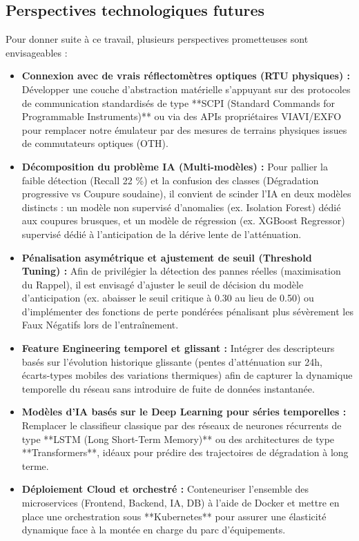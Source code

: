 \documentclass[11pt,a4paper]{article}
\begin{document}
\subsection{Perspectives technologiques futures}
Pour donner suite à ce travail, plusieurs perspectives prometteuses sont envisageables :
\begin{itemize}
    \item \textbf{Connexion avec de vrais réflectomètres optiques (RTU physiques) :} Développer une couche d'abstraction matérielle s'appuyant sur des protocoles de communication standardisés de type **SCPI (Standard Commands for Programmable Instruments)** ou via des APIs propriétaires VIAVI/EXFO pour remplacer notre émulateur par des mesures de terrains physiques issues de commutateurs optiques (OTH).
    \item \textbf{Décomposition du problème IA (Multi-modèles) :} Pour pallier la faible détection (Recall 22 \%) et la confusion des classes (Dégradation progressive vs Coupure soudaine), il convient de scinder l'IA en deux modèles distincts : un modèle non supervisé d'anomalies (ex. Isolation Forest) dédié aux coupures brusques, et un modèle de régression (ex. XGBoost Regressor) supervisé dédié à l'anticipation de la dérive lente de l'atténuation.
    \item \textbf{Pénalisation asymétrique et ajustement de seuil (Threshold Tuning) :} Afin de privilégier la détection des pannes réelles (maximisation du Rappel), il est envisagé d'ajuster le seuil de décision du modèle d'anticipation (ex. abaisser le seuil critique à 0.30 au lieu de 0.50) ou d'implémenter des fonctions de perte pondérées pénalisant plus sévèrement les Faux Négatifs lors de l'entraînement.
    \item \textbf{Feature Engineering temporel et glissant :} Intégrer des descripteurs basés sur l'évolution historique glissante (pentes d'atténuation sur 24h, écarts-types mobiles des variations thermiques) afin de capturer la dynamique temporelle du réseau sans introduire de fuite de données instantanée.
    \item \textbf{Modèles d'IA basés sur le Deep Learning pour séries temporelles :} Remplacer le classifieur classique par des réseaux de neurones récurrents de type **LSTM (Long Short-Term Memory)** ou des architectures de type **Transformers**, idéaux pour prédire des trajectoires de dégradation à long terme.
    \item \textbf{Déploiement Cloud et orchestré :} Conteneuriser l'ensemble des microservices (Frontend, Backend, IA, DB) à l'aide de Docker et mettre en place une orchestration sous **Kubernetes** pour assurer une élasticité dynamique face à la montée en charge du parc d'équipements.
\end{itemize}
\end{document}
